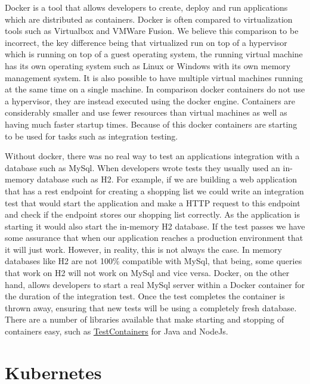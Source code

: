 Docker is a tool that allows developers to create, deploy and run applications which are distributed as containers. Docker is often compared to virtualization tools such as Virtualbox and VMWare Fusion. We believe this comparison to be incorrect, the key difference being that virtualized run on top of a hypervisor which is running on top of a guest operating system, the running virtual machine has its own operating system such as Linux or Windows with its own memory management system. It is also possible to have multiple virtual machines running at the same time on a single machine. In comparison docker containers do not use a hypervisor, they are instead executed using the docker engine. Containers are considerably smaller and use fewer resources than virtual machines as well as having much faster startup times. Because of this docker containers are starting to be used for tasks such as integration testing.

Without docker, there was no real way to test an applications integration with a database such as MySql. When developers wrote tests they usually used an in-memory database such as H2. For example, if we are building a web application that has a rest endpoint for creating a shopping list we could write an integration test that would start the application and make a HTTP request to this endpoint and check if the endpoint stores our shopping list correctly. As the application is starting it would also start the in-memory H2 database. If the test passes we have some assurance that when our application reaches a production environment that it will just work. However, in reality, this is not always the case. In memory databases like H2 are not 100\% compatible with MySql, that being, some queries that work on H2 will not work on MySql and vice versa. Docker, on the other hand, allows developers to start a real MySql server within a Docker container for the duration of the integration test. Once the test completes the container is thrown away, ensuring that new tests will be using a completely fresh database. There are a number of libraries available that make starting and stopping of containers easy, such as \href{https://www.testcontainers.org/}{TestContainers} for Java and NodeJs.

\section{Kubernetes}

